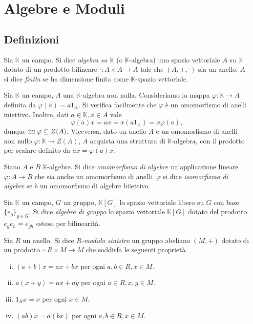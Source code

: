 \chapter{Algebre e Moduli}

\section{Definizioni}

\begin{definition}
Sia $\mathbb{K}$ un campo. Si dice \emph{algebra su $\mathbb{K}$} (o $\mathbb{K}$-algebra) uno spazio vettoriale $A$ su $\mathbb{K}$ dotato di un prodotto bilineare $\cdot:A\times A\to A$ tale che $(A,+,\cdot)$ sia un anello. $A$ si dice \emph{finita} se ha dimensione finita come $\mathbb{K}$-spazio vettoriale.
\end{definition}

\begin{remark}
Sia $\mathbb{K}$ un campo, $A$ una $\mathbb{K}$-algebra non nulla. Consideriamo la mappa $\varphi:\mathbb{K}\to A$ definita da $\varphi(a)=a1_A$. Si verifica facilmente che $\varphi$ è un omomorfismo di anelli iniettivo. Inoltre, dati $a\in\mathbb{K}\comma x\in A$ vale
$$
\varphi(a)x=ax=x(a1_A)=x\varphi(a),
$$
dunque $\operatorname{im}\varphi\subseteq Z(A)$. Viceversa, dato un anello $A$ e un omomorfismo di anelli non nullo $\varphi:\mathbb{K}\to Z(A)$, $A$ acquista una struttura di $\mathbb{K}$-algebra, con il prodotto per scalare definito da $ax=\varphi(a)x$.
\end{remark}

\begin{definition}
Siano $A$ e $B$ $\mathbb{K}$-algebre. Si dice \emph{omomorfismo di algebre} un'applicazione lineare $\varphi:A\to B$ che sia anche un omomorfismo di anelli. $\varphi$ si dice \emph{isomorfismo di algebre} se è un omomorfismo di algebre biiettivo.
\end{definition}

\begin{definition}
Sia $\mathbb{K}$ un campo, $G$ un gruppo, $\mathbb{K}[G]$ lo spazio vettoriale libero su $G$ con base $\{e_g\}_{g\in G}$. Si dice \emph{algebra di gruppo} lo spazio vettoriale $\mathbb{K}[G]$ dotato del prodotto $e_ge_h=e_{gh}$ esteso per bilinearità.
\end{definition}

\begin{definition}
Sia $R$ un anello. Si dice \emph{$R$-modulo sinistro} un gruppo abeliano $(M,+)$ dotato di un prodotto $\cdot:R\times M\to M$ che soddisfa le seguenti proprietà.
\begin{enumerate}[(i)]
\item $(a+b)x=ax+bx$ per ogni $a,b\in R\comma x\in M$.
\item $a(x+y)=ax+ay$ per ogni $a\in R\comma x,y\in M$.
\item $1_Rx=x$ per ogni $x\in M$.
\item $(ab)x=a(bx)$ per ogni $a,b\in R\comma x\in M$.
\end{enumerate}
\end{definition}

